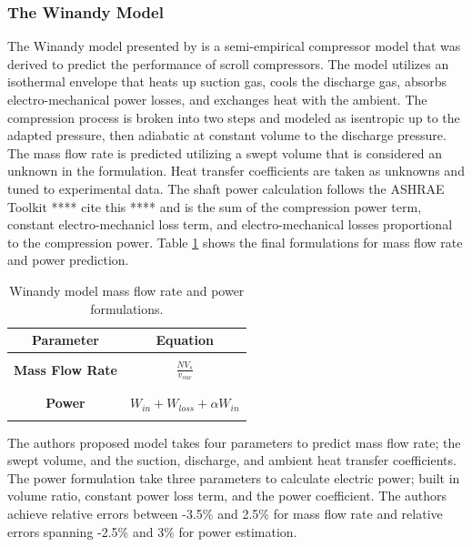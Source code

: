 \documentclass[preprint,11pt,authoryear]{elsarticle}
\begin{document}
\subsubsection{The Winandy Model}

The Winandy model presented by \cite{Winandy_scr} is a semi-empirical compressor model that was derived to predict the performance of scroll compressors. The model utilizes an isothermal envelope that heats up suction gas, cools the discharge gas, absorbs electro-mechanical power losses, and exchanges heat with the ambient. The compression process is broken into two steps and modeled as isentropic up to the adapted pressure, then adiabatic at constant volume to the discharge pressure. The mass flow rate is predicted utilizing a swept volume that is considered an unknown in the formulation. Heat transfer coefficients are taken as unknowns and tuned to experimental data. The shaft power calculation follows the ASHRAE Toolkit **** cite this **** and is the sum of the compression power term, constant electro-mechanicl loss term, and electro-mechanical losses proportional to the compression power. Table \ref{Tab:win_eqs} shows the final formulations for mass flow rate and power prediction. 

\begin{table}[h]
\caption{Winandy model mass flow rate and power formulations.}
\label{Tab:win_eqs}
\begin{center}
\begin{tabular}{c c}
\hline
\hline
\textbf{Parameter} & Equation \\
\hline
\hline 
\\[-3ex] %
\textbf{Mass Flow Rate} & \(\displaystyle \frac{NV_s}{v_{suc}}\) \\
\\[-3ex] %
\hline %
\\[-3ex] %
\textbf{Power} & \(\displaystyle W_{in} + W_{loss} + \alpha W_{in} \)
\\
\\[-3ex] %
\hline
\hline
\end{tabular}
\end{center}
\end{table}

The authors proposed model takes four parameters to predict mass flow rate; the swept volume, and the suction, discharge, and ambient heat transfer coefficients. The power formulation take three parameters to calculate electric power; built in volume ratio, constant power loss term, and the power coefficient. The authors achieve relative errors between -3.5\% and 2.5\% for mass flow rate and relative errors spanning -2.5\% and 3\% for power estimation. 
\end{document}
